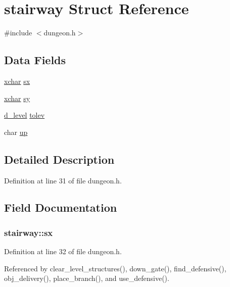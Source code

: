 \hypertarget{structstairway}{\section{stairway Struct Reference}
\label{structstairway}
}


{\ttfamily \#include $<$dungeon.\+h$>$}

\subsection*{Data Fields}
\begin{DoxyCompactItemize}
\item 
\hyperlink{global_8h_a2043b7d01ce89f4ee2fa6c345a752d32}{xchar} \hyperlink{structstairway_af8a3fe0724bfd9702ad9aae6aa2aa850}{sx}
\item 
\hyperlink{global_8h_a2043b7d01ce89f4ee2fa6c345a752d32}{xchar} \hyperlink{structstairway_a782c2bebca97b67e6299d2d5f8c2844f}{sy}
\item 
\hyperlink{structd__level}{d\+\_\+level} \hyperlink{structstairway_a6077e82bcb38b906ea0f10700a4d2273}{tolev}
\item 
char \hyperlink{structstairway_a094992532e8ae225101143f2c57d6d1a}{up}
\end{DoxyCompactItemize}


\subsection{Detailed Description}


Definition at line 31 of file dungeon.\+h.



\subsection{Field Documentation}
\hypertarget{structstairway_af8a3fe0724bfd9702ad9aae6aa2aa850}{
\subsubsection[{sx}]{ stairway\+::sx}}\label{structstairway_af8a3fe0724bfd9702ad9aae6aa2aa850}


Definition at line 32 of file dungeon.\+h.



Referenced by clear\+\_\+level\+\_\+structures(), down\+\_\+gate(), find\+\_\+defensive(), obj\+\_\+delivery(), place\+\_\+branch(), and use\+\_\+defensive().

